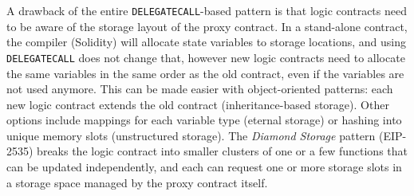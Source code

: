 
A drawback of the entire \texttt{DELEGATECALL}-based pattern is that logic contracts need to be aware of the storage layout of the proxy contract. In a stand-alone contract, the compiler (\eg Solidity) will allocate state variables to storage locations, and using \texttt{DELEGATECALL} does not change that, however new logic contracts need to allocate the same variables in the same order as the old contract, even if the variables are not used anymore. This can be made easier with object-oriented patterns: each new logic contract extends the old contract (inheritance-based storage). Other options include mappings for each variable type (eternal storage) or hashing into unique memory slots (unstructured storage). The \textit{Diamond Storage} pattern (EIP-2535) breaks the logic contract into smaller clusters of one or a few functions that can be updated independently, and each can request one or more storage slots in a storage space managed by the proxy contract itself. 







